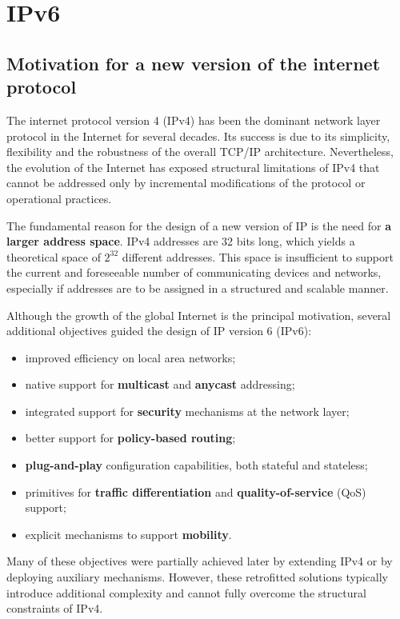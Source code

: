 \chapter{IPv6}

\section{Motivation for a new version of the internet protocol}

The internet protocol version 4 (IPv4) has been the dominant network layer protocol in the Internet for several decades. Its success is due to its simplicity, flexibility and the robustness of the overall TCP/IP architecture. Nevertheless, the evolution of the Internet has exposed structural limitations of IPv4 that cannot be addressed only by incremental modifications of the protocol or operational practices.

The fundamental reason for the design of a new version of IP is the need for \textbf{a larger address space}. IPv4 addresses are 32 bits long, which yields a theoretical space of $2^{32}$ different addresses. This space is insufficient to support the current and foreseeable number of communicating devices and networks, especially if addresses are to be assigned in a structured and scalable manner.

Although the growth of the global Internet is the principal motivation, several additional objectives guided the design of IP version 6 (IPv6):

\begin{itemize}
\item improved efficiency on local area networks;
\item native support for \textbf{multicast} and \textbf{anycast} addressing;
\item integrated support for \textbf{security} mechanisms at the network layer;
\item better support for \textbf{policy-based routing};
\item \textbf{plug-and-play} configuration capabilities, both stateful and stateless;
\item primitives for \textbf{traffic differentiation} and \textbf{quality-of-service} (QoS) support;
\item explicit mechanisms to support \textbf{mobility}.
\end{itemize}

Many of these objectives were partially achieved later by extending IPv4 or by deploying auxiliary mechanisms. However, these retrofitted solutions typically introduce additional complexity and cannot fully overcome the structural constraints of IPv4.

